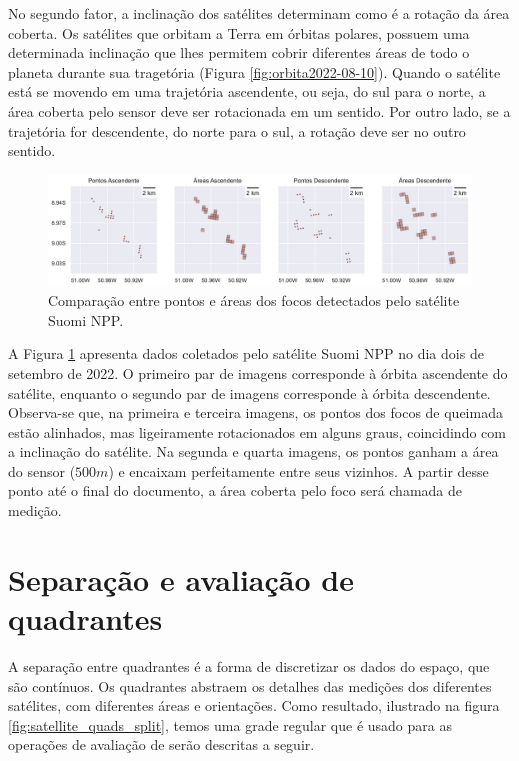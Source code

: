 \documentclass[cic,tc]{iiufrgs}
\begin{document}
No segundo fator, a inclinação dos satélites determinam como é a rotação da área coberta. Os satélites que orbitam a Terra em órbitas polares, possuem uma determinada inclinação que lhes permitem cobrir diferentes áreas de todo o planeta durante sua tragetória (Figura \ref{fig:orbita2022-08-10}). Quando o satélite está se movendo em uma trajetória ascendente, ou seja, do sul para o norte, a área coberta pelo sensor deve ser rotacionada em um sentido. Por outro lado, se a trajetória for descendente, do norte para o sul, a rotação deve ser no outro sentido. \par

\begin{figure}[H]
    \caption{Comparação entre pontos e áreas dos focos detectados pelo satélite Suomi NPP.}
    \begin{center}
        \includegraphics[width=35em]{comparacao_pontos_e_areas}
    \end{center}
    \label{fig:comparacao_pontos_e_areas}
\end{figure}

A Figura \ref{fig:comparacao_pontos_e_areas} apresenta dados coletados pelo satélite  Suomi NPP no dia dois de setembro de 2022. O primeiro par de imagens corresponde à órbita ascendente do satélite, enquanto o segundo par de imagens corresponde à órbita descendente. Observa-se que, na primeira e terceira imagens, os pontos dos focos de queimada estão alinhados, mas ligeiramente rotacionados em alguns graus, coincidindo com a inclinação do satélite. Na segunda e quarta imagens, os pontos ganham a área do sensor ($500m$) e encaixam perfeitamente entre seus vizinhos. A partir desse ponto até o final do documento, a área coberta pelo foco será chamada de medição. \par

\section{Separação e avaliação de quadrantes}

A separação entre quadrantes é a forma de discretizar os dados do espaço, que são contínuos. Os quadrantes abstraem os detalhes das medições dos diferentes satélites, com diferentes áreas e orientações. Como resultado, ilustrado na figura \ref{fig:satellite_quads_split}, temos uma grade regular que é usado para as operações de avaliação de serão descritas a seguir. \par
\end{document}
